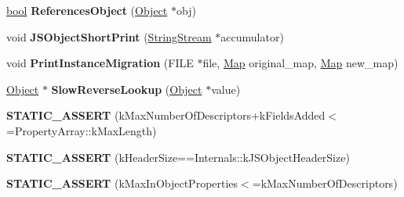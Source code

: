 \begin{DoxyCompactItemize}
\item 
\mbox{\label{classv8_1_1internal_1_1JSObject_a7055378a4956dab348a946e35ab9bf9b}} 
\mbox{\hyperlink{classbool}{bool}} {\bfseries References\+Object} (\mbox{\hyperlink{classv8_1_1internal_1_1Object}{Object}} $\ast$obj)
\item 
\mbox{\label{classv8_1_1internal_1_1JSObject_a462b6fa796709b5af86864e5f67527a8}} 
void {\bfseries J\+S\+Object\+Short\+Print} (\mbox{\hyperlink{classv8_1_1internal_1_1StringStream}{String\+Stream}} $\ast$accumulator)
\item 
\mbox{\label{classv8_1_1internal_1_1JSObject_a2d71aa3a6c90bd1e05302663a48ab516}} 
void {\bfseries Print\+Instance\+Migration} (F\+I\+LE $\ast$file, \mbox{\hyperlink{classv8_1_1internal_1_1Map}{Map}} original\+\_\+map, \mbox{\hyperlink{classv8_1_1internal_1_1Map}{Map}} new\+\_\+map)
\item 
\mbox{\label{classv8_1_1internal_1_1JSObject_ab8ea3e6f2a56010d4cb64faf49c87216}} 
\mbox{\hyperlink{classv8_1_1internal_1_1Object}{Object}} $\ast$ {\bfseries Slow\+Reverse\+Lookup} (\mbox{\hyperlink{classv8_1_1internal_1_1Object}{Object}} $\ast$value)
\item 
\mbox{\label{classv8_1_1internal_1_1JSObject_ac1eebc10c11125de8a8c0abbaf6ca1ec}} 
{\bfseries S\+T\+A\+T\+I\+C\+\_\+\+A\+S\+S\+E\+RT} (k\+Max\+Number\+Of\+Descriptors+k\+Fields\+Added$<$=Property\+Array\+::k\+Max\+Length)
\item 
\mbox{\label{classv8_1_1internal_1_1JSObject_a627ceb9c7966102a33d1f0df7d74ca3c}} 
{\bfseries S\+T\+A\+T\+I\+C\+\_\+\+A\+S\+S\+E\+RT} (k\+Header\+Size==Internals\+::k\+J\+S\+Object\+Header\+Size)
\item 
\mbox{\label{classv8_1_1internal_1_1JSObject_a788fb5b5b38414ae5011fcbacd99b5f3}} 
{\bfseries S\+T\+A\+T\+I\+C\+\_\+\+A\+S\+S\+E\+RT} (k\+Max\+In\+Object\+Properties$<$=k\+Max\+Number\+Of\+Descriptors)
\item 
\mbox{\label{classv8_1_1internal_1_1JSObject_a2d616c8b3a54abc5a8f0304319f5f941}} 

\end{DoxyCompactItemize}
